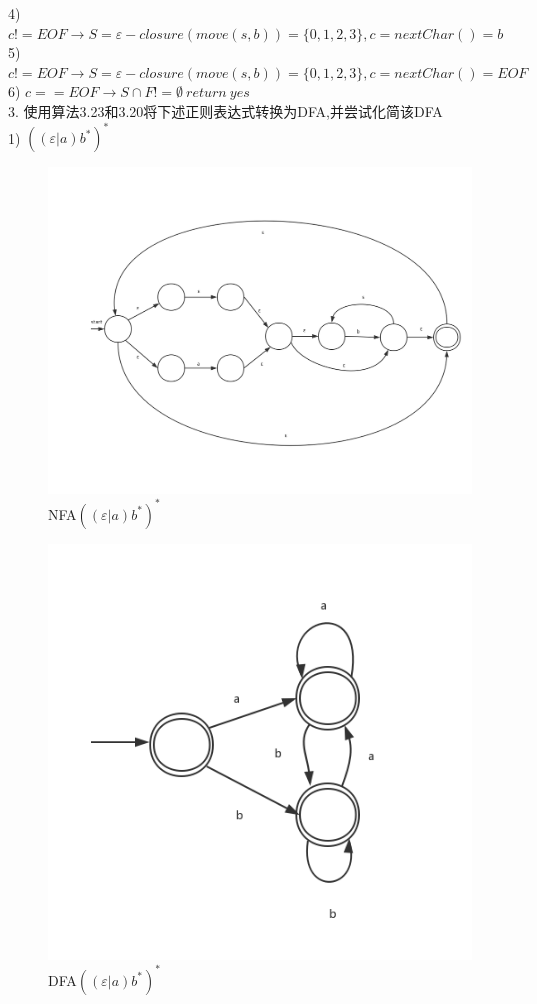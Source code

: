 \documentclass[a4paper, 16pt]{article}
\begin{document}
	4) $c != EOF \rightarrow S = \varepsilon-closure(move(s,b)) = \{0, 1, 2, 3\}, c = nextChar() = b$\\
	
	5) $c != EOF \rightarrow S = \varepsilon-closure(move(s,b)) = \{0, 1, 2, 3\}, c = nextChar() = EOF$\\
	
	6) $c == EOF \rightarrow S \cap F != \emptyset \: return \:yes$\\
	
3. 使用算法3.23和3.20将下述正则表达式转换为DFA,并尝试化简该DFA\\

1) $((\varepsilon|a)b^*)^*$\\
\begin{figure}[H]
\centering
\includegraphics[scale = 0.4]{chapter3_hw2_3}
\caption{NFA$((\varepsilon|a)b^*)^*$}
\label{f1}
\end{figure}

\begin{figure}[H]
\centering
\includegraphics[scale = 0.6]{chapter3_hw2_4}
\caption{DFA$((\varepsilon|a)b^*)^*$}
\label{f1}
\end{figure}
\end{document}
